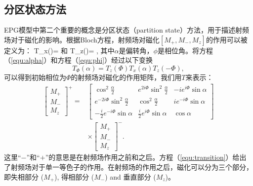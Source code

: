 \subsection{分区状态方法}
EPG模型中第二个重要的概念是分区状态（partition state）方法，用于描述射频场对于磁化的影响。根据Bloch方程，射频场对磁化$[M_+,M_-,M_z]$的作用可以被定义为：
 \beq 
  T_x(\alpha)=
   \label{equ:alpha}
 \eeq 
和
 \beq 
  T_z(\phi)=
  ,
   \label{equ:phi}
 \eeq
 其中$\alpha$是偏转角，$\phi$是相位角。将方程（\ref{equ:alpha}）和方程（\ref{equ:phi}）经过以下变换
 $$T_\Phi(\alpha)=T_z(\Phi) T_x(\alpha)T_z(-\Phi),$$
 可以得到初始相位为$\Phi$的射频场对磁化的作用矩阵，我们用$T$来表示：
\begin{align} 
 \left[
  \begin{matrix}
   M_+ \\
   M_- \\
   M_z
   \end{matrix}
   \right]^+
   =&
   \left[
  \begin{matrix}
   \cos^2\frac{\alpha}{2} & e^{2i\Phi}\sin^2\frac{\alpha}{2} & -ie^{i\Phi}\sin\alpha \\
   e^{-2i\Phi}\sin^2\frac{\alpha}{2} & \cos^2\frac{\alpha}{2} & ie^{-i\Phi}\sin\alpha \\
   -\frac{i}{2}e^{-i\Phi}\sin\alpha & \frac{i}{2}e^{i\Phi}\sin\alpha & \cos\alpha
   \end{matrix}
   \right] \nonumber\\
   & \times
   \left[
  \begin{matrix}
   M_+ \\
   M_- \\
   M_z
   \end{matrix}
   \right]^-.
   \label{equ:transition}
 \end{align}
这里``$-$''和``$+$''的意思是在射频场作用之前和之后。方程（\ref{equ:transition}）给出了射频场对于单一等色子的作用。在射频场的作用之后，磁化可以分为三个部分，即失相部分 ($M_+$), 得相部分 ($M_-$) and 垂直部分 ($M_z$)。

